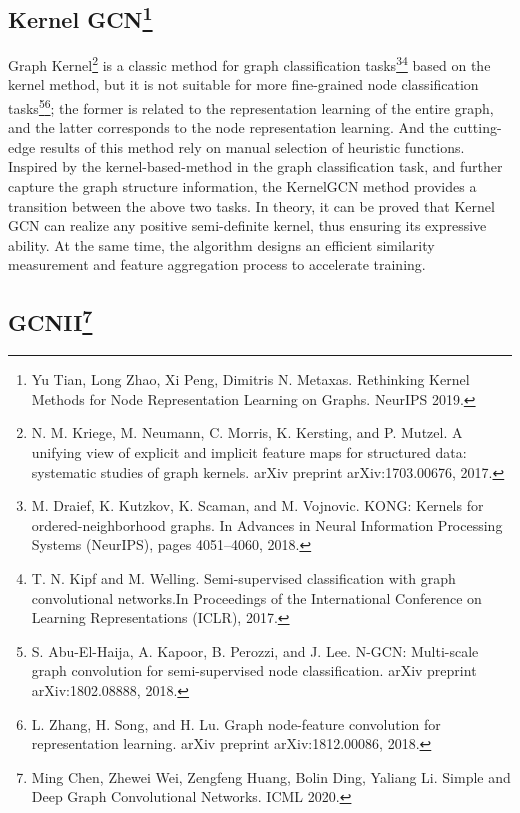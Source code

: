 \documentclass[11pt]{article}
\begin{document}
\subsection{Kernel GCN\footnote{Yu Tian, Long Zhao, Xi Peng, Dimitris N. Metaxas. Rethinking Kernel Methods for Node Representation Learning on Graphs. NeurIPS 2019.}}

Graph Kernel\footnote{N. M. Kriege, M. Neumann, C. Morris, K. Kersting, and P. Mutzel. A unifying view of explicit and implicit feature maps for structured data: systematic studies of graph kernels. arXiv preprint arXiv:1703.00676, 2017.} is a classic method for graph classification tasks\footnote{M. Draief, K. Kutzkov, K. Scaman, and M. Vojnovic. KONG: Kernels for ordered-neighborhood graphs. In Advances in Neural Information Processing Systems (NeurIPS), pages 4051–4060, 2018.}\footnote{T. N. Kipf and M. Welling. Semi-supervised classiﬁcation with graph convolutional networks.In Proceedings of the International Conference on Learning Representations (ICLR), 2017.}   based on the kernel method, but it is not suitable for more fine-grained node classification tasks\footnote{S. Abu-El-Haija, A. Kapoor, B. Perozzi, and J. Lee. N-GCN: Multi-scale graph convolution for semi-supervised node classiﬁcation. arXiv preprint arXiv:1802.08888, 2018.}\footnote{L. Zhang, H. Song, and H. Lu. Graph node-feature convolution for representation learning.
	arXiv preprint arXiv:1812.00086, 2018.}; the former is related to the representation learning of the entire graph, and the latter corresponds to the node representation learning. And the cutting-edge results of this method rely on manual selection of heuristic functions. Inspired by the kernel-based-method in the graph classification task, and further capture the graph structure information, the KernelGCN method provides a transition between the above two tasks. In theory, it can be proved that Kernel GCN can realize any positive semi-definite kernel, thus ensuring its expressive ability. At the same time, the algorithm designs an efficient similarity measurement and feature aggregation process to accelerate training.

\subsection{GCNII\footnote{Ming Chen, Zhewei Wei, Zengfeng Huang, Bolin Ding, Yaliang Li. Simple and Deep Graph Convolutional Networks. ICML 2020.
}} 
\end{document}
